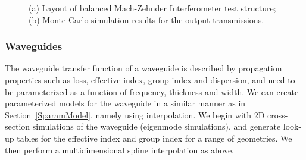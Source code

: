 \documentclass[journal]{spie}
\begin{document}
\begin{figure}[h]
	\centering
{} 
    \caption[]{(a) Layout of balanced Mach-Zehnder Interferometer test structure; (b) Monte Carlo simulation results for the output transmissions.}
    \label{MZI_common_MC}
\end{figure}

\subsubsection{Waveguides}
\label{sec:waveguide}
The waveguide transfer function of a waveguide is described by propagation properties such as loss, effective index, group index and dispersion, and need to be parameterized as a function of frequency, thickness and width. 
We can create parameterized models for the waveguide in a similar manner as in Section~\ref{SparamModel}, namely using interpolation.  We begin with 2D cross-section simulations of the waveguide (eigenmode simulations), and generate look-up tables for the effective index and group index for a range of geometries.  We then perform a multidimensional spline interpolation as above.
\end{document}
